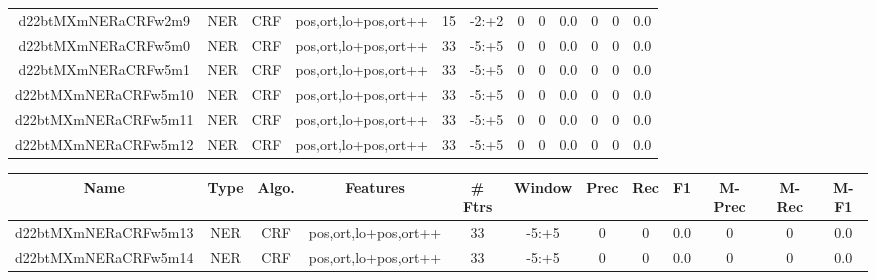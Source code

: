 \documentclass[a4paper]{article}
\begin{document}
\begin{landscape}
\begin{center}
\begin{tabular}{ |c|c|c|c|c|c|c|c|c|c|c|c|}
 
 	
 	\small{ d22btMXmNERaCRFw2m9 } & \small{ NER} & \small{  CRF }  & pos,ort,lo+pos,ort++  &  15 &  \small{  -2:+2 }  &  0 & 0 & 0.0  &  0 & 0 & 0.0 \\
 	

 
 	
 	\small{ d22btMXmNERaCRFw5m0 } & \small{ NER} & \small{  CRF }  & pos,ort,lo+pos,ort++  &  33 &  \small{  -5:+5 }  &  0 & 0 & 0.0  &  0 & 0 & 0.0 \\
 	

 
 	
 	\small{ d22btMXmNERaCRFw5m1 } & \small{ NER} & \small{  CRF }  & pos,ort,lo+pos,ort++  &  33 &  \small{  -5:+5 }  &  0 & 0 & 0.0  &  0 & 0 & 0.0 \\
 	

 
 	
 	\small{ d22btMXmNERaCRFw5m10 } & \small{ NER} & \small{  CRF }  & pos,ort,lo+pos,ort++  &  33 &  \small{  -5:+5 }  &  0 & 0 & 0.0  &  0 & 0 & 0.0 \\
 	

 
 	
 	\small{ d22btMXmNERaCRFw5m11 } & \small{ NER} & \small{  CRF }  & pos,ort,lo+pos,ort++  &  33 &  \small{  -5:+5 }  &  0 & 0 & 0.0  &  0 & 0 & 0.0 \\
 	

 
 	
 	\small{ d22btMXmNERaCRFw5m12 } & \small{ NER} & \small{  CRF }  & pos,ort,lo+pos,ort++  &  33 &  \small{  -5:+5 }  &  0 & 0 & 0.0  &  0 & 0 & 0.0 \\
 	
 \hline
\end{tabular}
\end{center}




\begin{center}
\begin{tabular}{ |c|c|c|c|c|c|c|c|c|c|c|c|} 
 \hline
 	Name & Type & Algo. & Features & \# Ftrs & Window & Prec & Rec & F1 & M-Prec & M-Rec & M-F1\\
 \hline

 	

 
 	
 	\small{ d22btMXmNERaCRFw5m13 } & \small{ NER} & \small{  CRF }  & pos,ort,lo+pos,ort++  &  33 &  \small{  -5:+5 }  &  0 & 0 & 0.0  &  0 & 0 & 0.0 \\
 	

 
 	
 	\small{ d22btMXmNERaCRFw5m14 } & \small{ NER} & \small{  CRF }  & pos,ort,lo+pos,ort++  &  33 &  \small{  -5:+5 }  &  0 & 0 & 0.0  &  0 & 0 & 0.0 \\
 	


\end{tabular}
\end{center}
\end{landscape}
\end{document}
